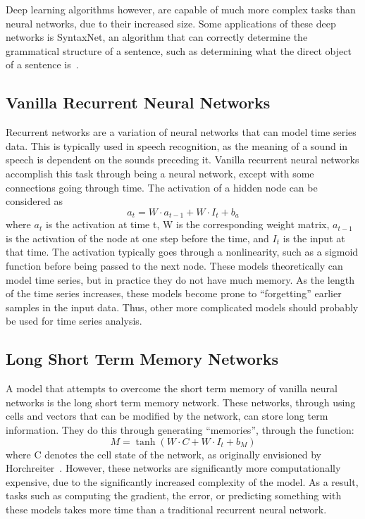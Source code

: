 \documentclass{article}
\begin{document}
Deep learning algorithms however, are capable of much more complex tasks than
neural networks, due to their increased size. Some applications of these deep
networks is SyntaxNet, an algorithm that can correctly determine the grammatical
structure of a sentence, such as determining what the direct object of a
sentence is~\cite{syntaxnet}.


\subsection{Vanilla Recurrent Neural Networks}
Recurrent networks are a variation of neural networks that can model time series
data. This is typically used in speech recognition, as the meaning of a sound in
speech is dependent on the sounds preceding it. Vanilla recurrent neural
networks accomplish this task through being a neural network, except with some
connections going through time.  The activation of a hidden node can be
considered as 
$$a_t = W\cdot a_{t-1} + W\cdot I_t + b_a$$
where $a_t$ is the activation at time t, W is the corresponding weight matrix,
$a_{t-1}$ is the activation of the node at one step before the time, and $I_t$
is the input at that time. The activation typically goes through a nonlinearity,
such as a sigmoid function before being passed to the next node. These models
theoretically can model time series, but in practice they do not have much
memory. As the length of the time series increases, these models become prone to
``forgetting'' earlier samples in the input data. Thus, other more complicated
models should probably be used for time series analysis.

\subsection{Long Short Term Memory Networks}
A model that attempts to overcome the short term memory of vanilla neural
networks is the long short term memory network. These networks, through using
cells and vectors that can be modified by the network, can store long term
information. They do this through generating ``memories'', through the function:
$$M = \tanh(W\cdot C + W\cdot I_t + b_M)$$ where C denotes the cell state of the
network, as originally envisioned by Horchreiter~\cite{lstm}. However, these
networks are significantly more computationally expensive, due to the
significantly increased complexity of the model. As a result, tasks such as
computing the gradient, the error, or predicting something with these models
takes more time than a traditional recurrent neural network.
\end{document}
